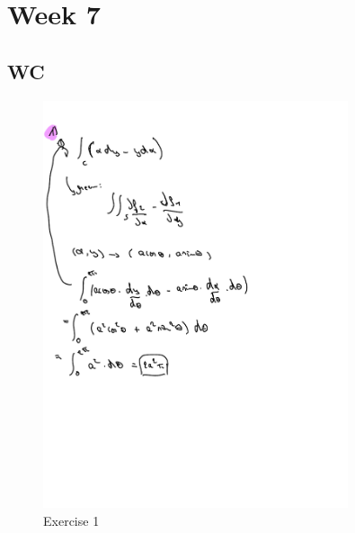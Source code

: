 \documentclass[a4paper]{report}
\begin{document}
\section{Week 7}

\subsection{WC}

\begin{figure}[H]
	\centering
	\includegraphics[width=0.8\textwidth]{assets/wc_7_ex_1.pdf}
	\caption{Exercise 1}
	\label{fig:wc_7_ex_1}
\end{figure}
\end{document}
